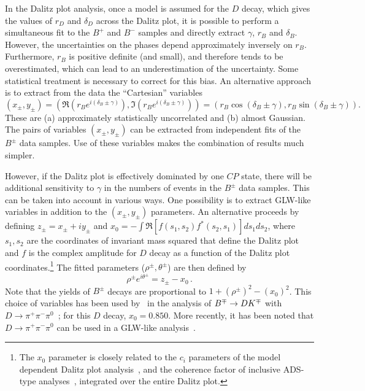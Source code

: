 In the Dalitz plot analysis,
once a model is assumed for the $D$ decay, 
which gives the values of $r_D$ and $\delta_D$ across the Dalitz plot,
it is possible to perform a simultaneous fit to the $B^+$ and $B^-$ samples 
and directly extract $\gamma$, $r_B$ and $\delta_B$.
However, the uncertainties on the phases depend approximately inversely on $r_B$.
Furthermore, $r_B$ is positive definite (and small), 
and therefore tends to be overestimated,
which can lead to an underestimation of the uncertainty.
Some statistical treatment is necessary to correct for this bias.
An alternative approach is to extract from the data the ``Cartesian''
variables
\begin{equation}
  \left( x_\pm, y_\pm \right) = 
  \left( \Re(r_B e^{i(\delta_B\pm\gamma)}), \Im(r_B e^{i(\delta_B\pm\gamma)}) \right) = 
  \left( r_B \cos(\delta_B\pm\gamma), r_B \sin(\delta_B\pm\gamma) \right).
\end{equation}
These are (a) approximately statistically uncorrelated 
and (b) almost Gaussian.
The pairs of variables $\left( x_\pm, y_\pm \right)$ can be extracted
from independent fits of the $B^\pm$ data samples.
Use of these variables makes the combination of results much simpler.

However, if the Dalitz plot is effectively dominated by one $CP$ state,
there will be additional sensitivity to $\gamma$ in the numbers of events
in the $B^\pm$ data samples.
This can be taken into account in various ways.
One possibility is to extract GLW-like variables 
in addition to the $\left( x_\pm, y_\pm \right)$ parameters.
An alternative proceeds by defining $z_\pm = x_\pm + i y_\pm$
and $x_0 = - \int \Re \left[ f(s_1,s_2)f^*(s_2,s_1) \right] ds_1ds_2$,
where $s_1, s_2$ are the coordinates of invariant mass squared that
define the Dalitz plot and $f$ is the complex amplitude for $D$ decay
as a function of the Dalitz plot coordinates.\footnote{
  The $x_0$ parameter is closely related to the $c_i$ parameters of 
  the model dependent Dalitz plot analysis~\cite{Giri:2003ty,Bondar:2005ki,Bondar:2008hh},
  and the coherence factor of inclusive ADS-type analyses~\cite{Atwood:2003mj},
  integrated over the entire Dalitz plot.
}
The fitted parameters ($\rho^\pm, \theta^\pm$) are then defined by
\begin{equation}
  \rho^\pm e^{i \theta^\pm} = z_\pm - x_0 \, .
\end{equation}
Note that the yields of $B^\pm$ decays are proportional 
to $1 + (\rho^\pm)^2 - (x_0)^2$. 
This choice of variables has been used by \babar\ in the analysis of
$B^\mp \to DK^\mp$ with $D \to \pi^+\pi^-\pi^0$~\cite{Aubert:2007ii};
for this $D$ decay, $x_0 = 0.850$.
More recently, it has been noted that $D \to \pi^+\pi^-\pi^0$ can be used in a
GLW-like analysis~\cite{Nayak:2014tea}.

